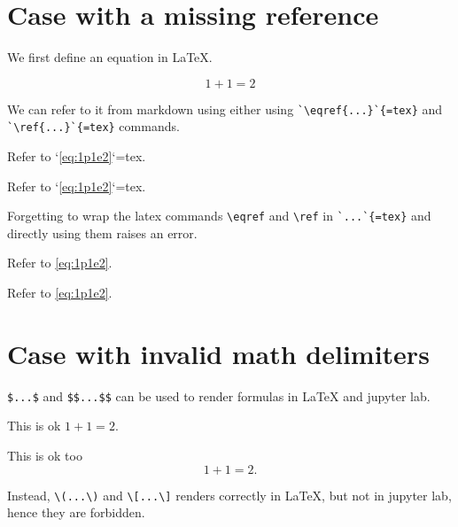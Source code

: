 \documentclass[oneside]{book}
\begin{document}
\chapter{Case with a missing reference}

We first define an equation in LaTeX.

\begin{equation}
1 + 1 = 2
\label{eq:1p1e2}
\end{equation}

We can refer to it from markdown using either using \verb|`\eqref{...}`{=tex}| and \verb|`\ref{...}`{=tex}| commands.

\begin{mdcell}
Refer to `\eqref{eq:1p1e2}`{=tex}.
\end{mdcell}

\begin{mdcell}
Refer to `\ref{eq:1p1e2}`{=tex}.
\end{mdcell}

Forgetting to wrap the latex commands \verb|\eqref| and \verb|\ref| in \verb|`...`{=tex}| and directly using them raises an error.

\begin{mdcell}
Refer to \eqref{eq:1p1e2}.
\end{mdcell}


\begin{mdcell}
Refer to \ref{eq:1p1e2}.
\end{mdcell}

\chapter{Case with invalid math delimiters}

\verb|$...$| and \verb|$$...$$| can be used to render formulas in LaTeX and jupyter lab.

\begin{mdcell}
This is ok $1 + 1 = 2$.
\end{mdcell}

\begin{mdcell}
This is ok too $$1 + 1 = 2.$$
\end{mdcell}

Instead, \verb|\(...\)| and \verb|\[...\]| renders correctly in LaTeX, but not in jupyter lab, hence they are forbidden.
\end{document}
